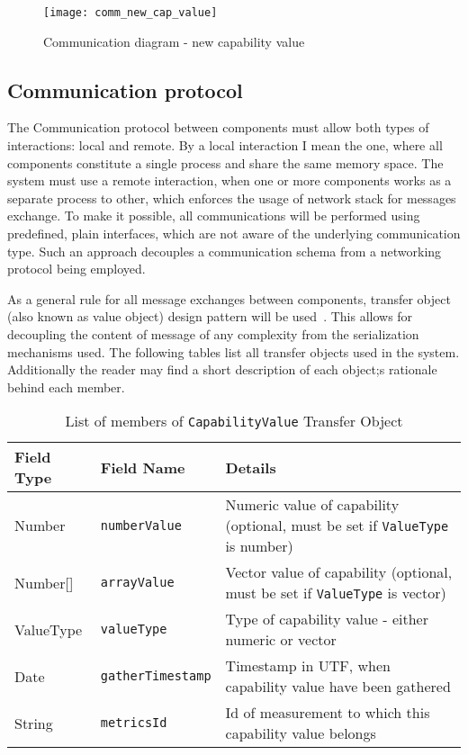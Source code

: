 \begin{figure}[ht]
\centering
\texttt{[image: comm\_new\_cap\_value]}
\caption{Communication diagram - new capability value}
\label{fig:comm_new_cap_value}
\end{figure}


\subsection{Communication protocol}
\label{subsec:arch_comm_protocol}

The Communication protocol between components must allow both types of interactions: local and remote. By a local interaction I mean the one, where all components constitute a single process and share the same memory space. The system must use a remote interaction, when one or more components works as a separate process to other, which enforces the usage of network stack for messages exchange. To make it possible, all communications will be performed using predefined, plain interfaces, which are not aware of the underlying communication type. Such an approach decouples a communication schema from a networking protocol being employed.

As a general rule for all message exchanges between components, transfer object (also known as value object) design pattern will be used~\cite{0131422464}. This allows for decoupling the content of message of any complexity from the serialization mechanisms used. The following tables list all transfer objects used in the system. Additionally the reader may find a short description of each object;s rationale behind each member. 

\renewcommand*\arraystretch{1.2}

\begin{table}[ht] %
\begin{tabular}{| m{} | m{} | m{} |}
\hline 
\cellcolor[gray]{0.9} Field Type & \cellcolor[gray]{0.9} Field Name & \cellcolor[gray]{0.9} Details \\
\hline 
Number & \texttt{numberValue} & Numeric value of capability (optional, must be set if \texttt{ValueType} is number) \\
Number[] & \texttt{arrayValue} & Vector value of capability (optional, must be set if \texttt{ValueType} is vector) \\
ValueType & \texttt{valueType} & Type of capability value - either numeric or vector\\
Date & \texttt{gatherTimestamp} & Timestamp in UTF, when capability value have been gathered \\
String & \texttt{metricsId} & Id of measurement to which this capability value belongs \\
\hline 
\end{tabular}
\caption{List of members of \texttt{CapabilityValue} Transfer Object}
\label{tab:TO_CapValue}
\end{table} %

